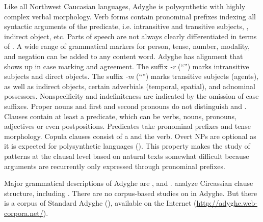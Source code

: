 \documentclass[output=paper,colorlinks,citecolor=brown, draft]{langscibook}
\begin{document}
Like all Northwest Caucasian languages, Adyghe is polysynthetic with highly complex verbal morphology. Verb forms contain pronominal prefixes indexing all syntactic arguments of the predicate, i.e. intransitive and transitive subjects, , indirect object, etc. Parts of speech are not always clearly differentiated in terms of . A wide range of grammatical markers for person, tense, number, modality, and negation can be added to any content word. Adyghe has  alignment that shows up in case marking and agreement. The suffix \textit{-r} (``'') marks intransitive subjects and direct objects. The suffix \textit{-m} (``'') marks transitive subjects (agents), as well as indirect objects, certain adverbials (temporal, spatial), and adnominal possessors. Nonspecificity and indefiniteness are indicated by the omission of case suffixes. Proper nouns and first and second pronouns do not distinguish  and . Clauses contain at least a predicate, which can be verbs, nouns, pronouns, adjectives or even postpositions. Predicates take pronominal prefixes and tense morphology. Copula clauses consist of a   and the  verb. Overt  NPs are optional as it is expected for polysynthetic languages (\citealt{testelets2017adyghe}). This property makes the study of  patterns at the clausal level based on natural texts somewhat difficult because arguments are recurrently only expressed through pronominal prefixes.

Major grammatical descriptions of Adyghe are \citet{jakovlev1941grammatika}, \citet{rogava1966grammatika} and \citet{arkadiev2009aspekty}. \citet{kumakhov2009circassian} analyze Circassian clause structure, including . There are no corpus-based studies on  in Adyghe. But there is a corpus of Standard Adyghe (\citealt{arkhangelskiy2018west}), available on the Internet (\url{http://adyghe.web-corpora.net/}).
\end{document}
